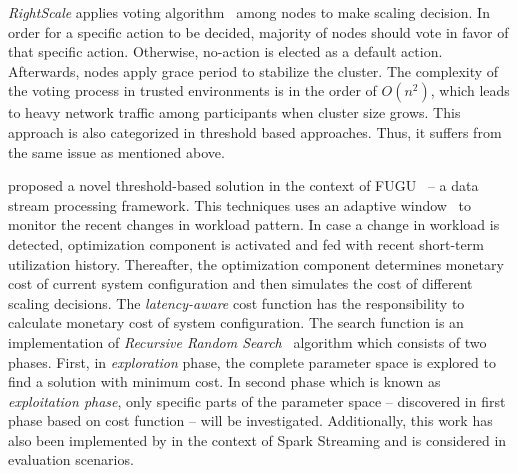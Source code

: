 \emph{RightScale} applies voting algorithm~\cite{RightScale} among nodes to make scaling decision. In order for a specific action to be decided, majority of nodes should vote in favor of that specific action. Otherwise, no-action is elected as a default action. Afterwards, nodes apply grace period to stabilize the cluster. The complexity of the voting process in trusted environments is in the order of $O(n^2)$, which leads to heavy network traffic among participants when cluster size grows. This approach is also categorized in threshold based approaches. Thus, it suffers from the same issue as mentioned above.

\textcite{Heinze:2015} proposed a novel threshold-based solution in the context of FUGU~\cite{Grandl:2014:MPC} -- a data stream processing framework. This techniques uses an adaptive window~\cite{Bifet:2007} to monitor the recent changes in workload pattern. In case a change in workload is detected, optimization component is activated and fed with recent short-term utilization history. Thereafter, the optimization component determines monetary cost of current system configuration and then simulates the cost of different scaling decisions. The \emph{latency-aware} cost function has the responsibility to calculate monetary cost of system configuration. The search function is an implementation of \emph{Recursive Random Search}~\cite{Ye:2003:RRS} algorithm which consists of two phases. First, in \emph{exploration} phase, the complete parameter space is explored to find a solution with minimum cost. In second phase which is known as \emph{exploitation phase}, only specific parts of the parameter space -- discovered in first phase based on cost function -- will be investigated. Additionally, this work has also been implemented by \textcite{Michal:2017} in the context of Spark Streaming and is considered in evaluation scenarios.

